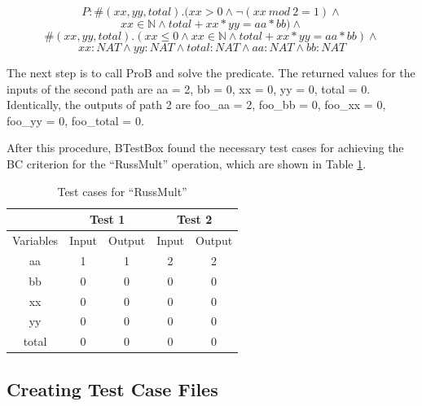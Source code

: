 \documentclass[runningheads]{llncs}
\begin{document}
$$P: \#(xx, yy, total).(xx > 0 \wedge \neg(xx\ mod\ 2 = 1) \wedge$$
$$ xx \in \mathbb{N} \wedge total + xx * yy = aa * bb) \wedge$$
$$\#(xx, yy, total).(xx \leq 0 \wedge xx \in \mathbb{N} \wedge total + xx * yy = aa * bb) \wedge$$
$$xx : NAT \wedge yy : NAT \wedge total : NAT \wedge aa : NAT \wedge bb : NAT$$

The next step is to call ProB and solve the predicate. The returned values for the inputs of the second path are aa = 2, bb = 0, xx = 0, yy = 0, total = 0. Identically, the outputs of path 2 are foo\_aa = 2, foo\_bb = 0, foo\_xx = 0, foo\_yy = 0, foo\_total = 0.

After this procedure, BTestBox found the necessary test cases for achieving the BC criterion for the ``RussMult'' operation, which are shown in Table \ref{tab:TestCases}.


\begin{table}[h]
\centering
\caption{Test cases for ``RussMult''}
\begin{tabular}{c|c|c|c|c|}
\cline{2-5}
                                & \multicolumn{2}{c|}{Test 1} & \multicolumn{2}{c|}{Test 2} \\ \hline
\multicolumn{1}{|c|}{Variables} & Input        & Output       & Input        & Output       \\ \hline
\multicolumn{1}{|c|}{aa}        & 1            & 1            & 2            & 2            \\ \hline
\multicolumn{1}{|c|}{bb}        & 0            & 0            & 0            & 0            \\ \hline
\multicolumn{1}{|c|}{xx}        & 0            & 0            & 0            & 0            \\ \hline
\multicolumn{1}{|c|}{yy}        & 0            & 0            & 0            & 0            \\ \hline
\multicolumn{1}{|c|}{total}     & 0            & 0            & 0            & 0            \\ \hline
\end{tabular}
\label{tab:TestCases}
\end{table}

\subsection{Creating Test Case Files}
\end{document}
